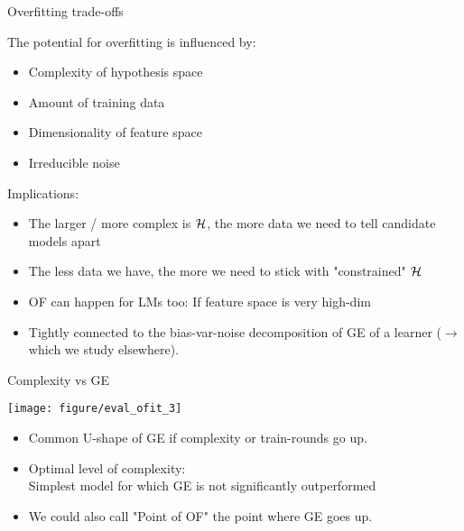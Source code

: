 \documentclass[11pt,compress,t,notes=noshow, xcolor=table]{beamer}
\begin{document}
\begin{vbframe}{Overfitting trade-offs}

The potential for overfitting is influenced by:
\begin{itemize}
  \item Complexity of hypothesis space
  \item Amount of training data
  \item Dimensionality of feature space
  \item Irreducible noise 
\end{itemize}
\lz
Implications:
\begin{itemize}
\item The larger / more complex is $\mathcal{H}$, 
    the more data we need to tell candidate models apart
\item The less data we have, the more we need to stick with "constrained" $\mathcal{H}$
\item OF can happen for LMs too: If feature space is very high-dim
\item Tightly connected to the bias-var-noise decomposition of GE
of a learner ($\rightarrow$ which we study elsewhere).
\end{itemize}
\end{vbframe}


\begin{vbframe}{Complexity vs GE}

\begin{center}
\texttt{[image: figure/eval\_ofit\_3]} 
\end{center}


\vfill

\begin{itemize}
\item Common U-shape of GE if complexity or train-rounds go up.
\item Optimal level of complexity:\\
    Simplest model for which GE is not significantly outperformed
\item We could also call "Point of OF" the point where GE goes up. 
\end{itemize}

\end{vbframe}
\end{document}
